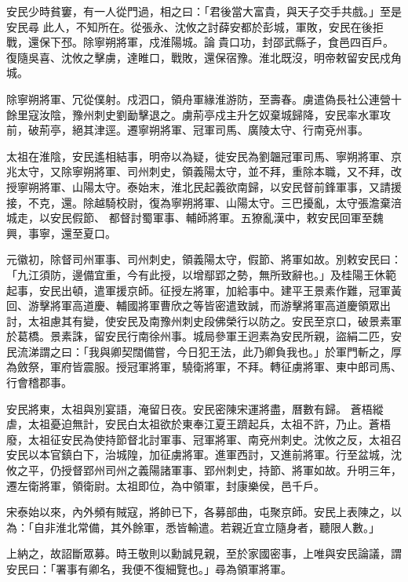 \begin{pinyinscope}
 安民少時貧窶，有一人從門過，相之曰：「君後當大富貴，與天子交手共戲。」至是安民尋
 此人，不知所在。從張永、沈攸之討薛安都於彭城，軍敗，安民在後拒戰，還保下邳。除寧朔將軍，戍淮陽城。論貴口功，封邵武縣子，食邑四百戶。復隨吳喜、沈攸之擊虜，達睢口，戰敗，還保宿豫。淮北既沒，明帝敕留安民戍角城。



 除寧朔將軍、冗從僕射。戍泗口，領舟軍緣淮游防，至壽春。虜遣偽長社公連營十餘里寇汝陰，豫州刺史劉勔擊退之。虜荊亭戍主升乞奴棄城歸降，安民率水軍攻前，破荊亭，絕其津逕。遷寧朔將軍、冠軍司馬、廣陵太守、行南兗州事。



 太祖在淮陰，安民遙相結事，明帝以為疑，徙安民為劉韞冠軍司馬、寧朔將軍、京兆太守，又除寧朔將軍、司州刺史，領義陽太守，並不拜，重除本職，又不拜，改授寧朔將軍、山陽太守。泰始末，淮北民起義欲南歸，以安民督前鋒軍事，又請援接，不克，還。除越騎校尉，復為寧朔將軍、山陽太守。三巴擾亂，太守張澹棄涪城走，以安民假節、
 都督討蜀軍事、輔師將軍。五獠亂漢中，敕安民回軍至魏興，事寧，還至夏口。



 元徽初，除督司州軍事、司州刺史，領義陽太守，假節、將軍如故。別敕安民曰：「九江須防，邊備宜重，今有此授，以增鄢郢之勢，無所致辭也。」及桂陽王休範起事，安民出頓，遣軍援京師。征授左將軍，加給事中。建平王景素作難，冠軍黃回、游擊將軍高道慶、輔國將軍曹欣之等皆密遣致誠，而游擊將軍高道慶領眾出討，太祖慮其有變，使安民及南豫州刺史段佛榮行以防之。安民至京口，破景素軍於葛橋。景素誅，留安民行南徐州事。城局參軍王迥素為安民所親，盜絹二匹，安民流涕謂之曰：「我與卿契闊備嘗，今日犯王法，此乃卿負我也。」於軍門斬之，厚為斂祭，軍府皆震服。授冠軍將軍，驍衛將軍，不拜。轉征虜將軍、東中郎司馬、行會稽郡事。



 安民將東，太祖與別宴語，淹留日夜。安民密陳宋運將盡，曆數有歸。
 蒼梧縱虐，太祖憂迫無計，安民白太祖欲於東奉江夏王躋起兵，太祖不許，乃止。蒼梧廢，太祖征安民為使持節督北討軍事、冠軍將軍、南兗州刺史。沈攸之反，太祖召安民以本官鎮白下，治城隍，加征虜將軍。進軍西討，又進前將軍。行至盆城，沈攸之平，仍授督郢州司州之義陽諸軍事、郢州刺史，持節、將軍如故。升明三年，遷左衛將軍，領衛尉。太祖即位，為中領軍，封康樂侯，邑千戶。



 宋泰始以來，內外頻有賊寇，將帥已下，各募部曲，屯聚京師。安民上表陳之，以為：「自非淮北常備，其外餘軍，悉皆輸遣。若親近宜立隨身者，聽限人數。」



 上納之，故詔斷眾募。時王敬則以勳誠見親，至於家國密事，上唯與安民論議，謂安民曰：「署事有卿名，我便不復細覽也。」尋為領軍將軍。




\end{pinyinscope}
